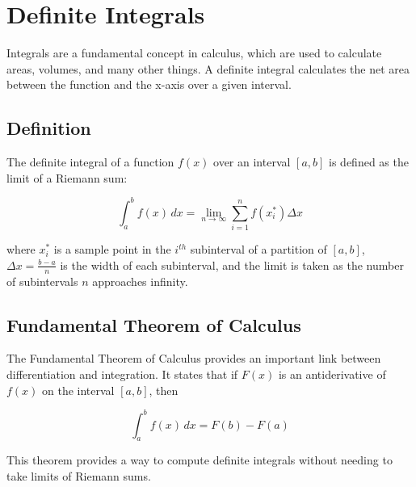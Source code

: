 \chapter{Definite Integrals}



Integrals are a fundamental concept in calculus, which are used to calculate areas, volumes, and many other things. A definite integral calculates the net area between the function and the x-axis over a given interval.

\section{Definition}

The definite integral of a function $f(x)$ over an interval $[a, b]$ is defined as the limit of a Riemann sum:

\begin{equation}
\int_{a}^{b} f(x) \, dx = \lim_{{n \to \infty}} \sum_{i=1}^{n} f(x_i^*) \Delta x
\end{equation}

where $x_i^*$ is a sample point in the $i^{th}$ subinterval of a partition of $[a, b]$, $\Delta x = \frac{b-a}{n}$ is the width of each subinterval, and the limit is taken as the number of subintervals $n$ approaches infinity.

\section{Fundamental Theorem of Calculus}

The Fundamental Theorem of Calculus provides an important link between differentiation and integration. It states that if $F(x)$ is an antiderivative of $f(x)$ on the interval $[a, b]$, then

\begin{equation}
\int_{a}^{b} f(x) \, dx = F(b) - F(a)
\end{equation}

This theorem provides a way to compute definite integrals without needing to take limits of Riemann sums.

\